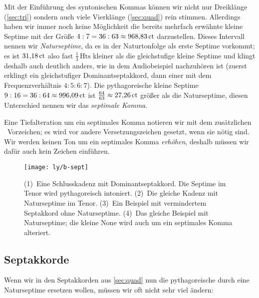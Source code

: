 Mit der Einführung des syntonischen Kommas können wir nicht nur Dreiklänge
(\cref{sec:tri}) sondern auch viele Vierklänge (\cref{sec:quad}) rein stimmen.
Allerdings haben wir immer noch keine Möglichkeit die bereits mehrfach erwähnte
kleine Septime mit der Größe $4:7=36:63\approx 968{,}83\,\mathrm{ct}$ darzustellen.
Dieses Intervall nennen wir \emph{Naturseptime}, da es in der Naturtonfolge als
erste Septime vorkommt; es ist $31{,}18\,\mathrm{ct}$ also fast
$\frac13\,\text{Hts}$ kleiner als die gleichstufige kleine Septime und
klingt deshalb auch deutlich anders, wie in dem Audiobeispiel nachzuhören
ist (zuerst erklingt ein gleichstufiger Dominantseptakkord, dann
einer mit dem Frequenzverhältnis $4:5:6:7$). Die pythagoreische kleine Septime
$9:16=36:64\approx 996{,}09\,\mathrm{ct}$ ist
$\frac{64}{63}\approx 27{,}26\,\mathrm{ct}$ größer als die Naturseptime, diesen
Unterschied nennen wir das \emph{septimale Komma}.

Eine Tiefalteration um ein septimales Komma notieren wir mit dem zusätzlichen
\septimal\ Vorzeichen; es wird vor andere Versetzungszeichen gesetzt, wenn sie
nötig sind. Wir werden keinen Ton um ein septimales Komma \emph{erhöhen},
deshalb müssen wir dafür auch kein Zeichen einführen.

\begin{figure}
	\centering
	\texttt{[image: ly/b-sept]}
	\caption{(1)~Eine Schlusskadenz mit Dominantseptakkord. Die Septime im
		Tenor wird pythagoreisch intoniert.
		\quad(2)~Die gleiche Kadenz mit Naturseptime im Tenor.
		\quad(3)~Ein Beispiel mit vermindertem Septakkord ohne Naturseptime.
		\quad(4)~Das gleiche Beispiel mit Naturseptime; die kleine None wird
		auch um ein septimales Komma alteriert.}\label{fig:sept}
\end{figure}

\subsection{Septakkorde}

Wenn wir in den Septakkorden aus \cref{sec:quad} nun die pythagoreische durch
eine Naturseptime ersetzen wollen, müssen wir oft nicht sehr viel ändern:

